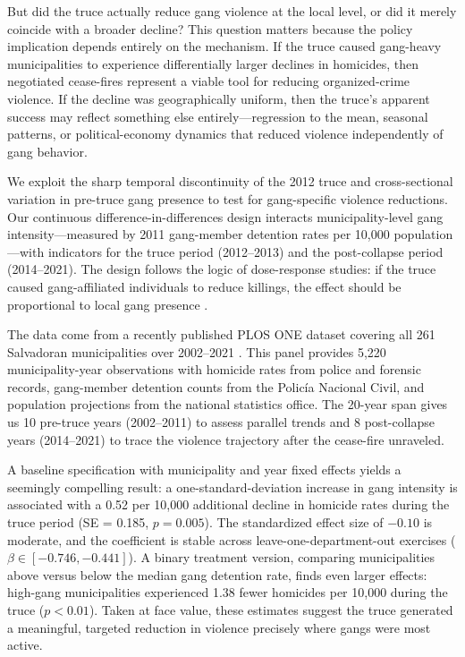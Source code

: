 \documentclass[12pt]{article}
\begin{document}
But did the truce actually reduce gang violence at the local level, or did it merely coincide with a broader decline? This question matters because the policy implication depends entirely on the mechanism. If the truce caused gang-heavy municipalities to experience differentially larger declines in homicides, then negotiated cease-fires represent a viable tool for reducing organized-crime violence. If the decline was geographically uniform, then the truce's apparent success may reflect something else entirely---regression to the mean, seasonal patterns, or political-economy dynamics that reduced violence independently of gang behavior.

We exploit the sharp temporal discontinuity of the 2012 truce and cross-sectional variation in pre-truce gang presence to test for gang-specific violence reductions. Our continuous difference-in-differences design interacts municipality-level gang intensity---measured by 2011 gang-member detention rates per 10,000 population---with indicators for the truce period (2012--2013) and the post-collapse period (2014--2021). The design follows the logic of dose-response studies: if the truce caused gang-affiliated individuals to reduce killings, the effect should be proportional to local gang presence \citep{callaway_santanna2021, goodman-bacon2021}.

The data come from a recently published PLOS ONE dataset covering all 261 Salvadoran municipalities over 2002--2021 \citep{plosone2024}. This panel provides 5,220 municipality-year observations with homicide rates from police and forensic records, gang-member detention counts from the Polic\'ia Nacional Civil, and population projections from the national statistics office. The 20-year span gives us 10 pre-truce years (2002--2011) to assess parallel trends and 8 post-collapse years (2014--2021) to trace the violence trajectory after the cease-fire unraveled.

A baseline specification with municipality and year fixed effects yields a seemingly compelling result: a one-standard-deviation increase in gang intensity is associated with a 0.52 per 10,000 additional decline in homicide rates during the truce period (SE = 0.185, $p = 0.005$). The standardized effect size of $-0.10$ is moderate, and the coefficient is stable across leave-one-department-out exercises ($\beta \in [-0.746, -0.441]$). A binary treatment version, comparing municipalities above versus below the median gang detention rate, finds even larger effects: high-gang municipalities experienced 1.38 fewer homicides per 10,000 during the truce ($p < 0.01$). Taken at face value, these estimates suggest the truce generated a meaningful, targeted reduction in violence precisely where gangs were most active.
\end{document}
